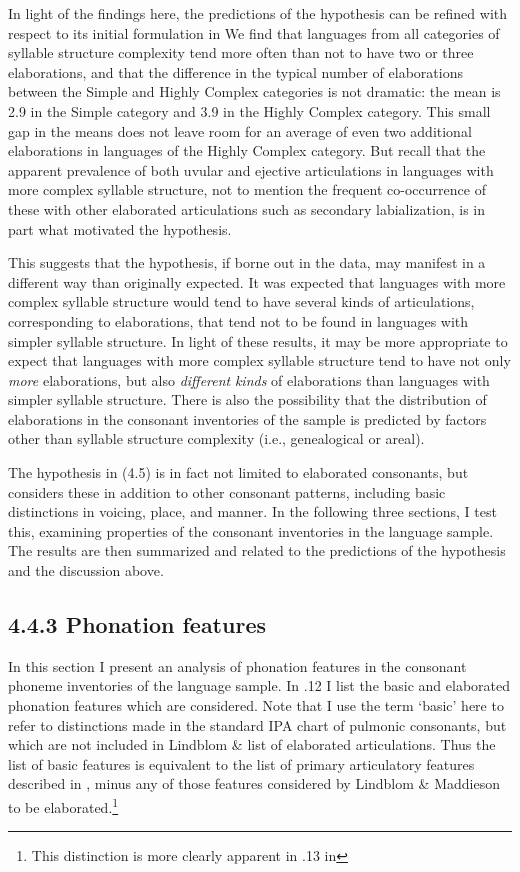   In light of the findings here, the predictions of the hypothesis can be refined with respect to its initial formulation in  We find that languages from all categories of syllable structure complexity tend more often than not to have two or three elaborations, and that the difference in the typical number of elaborations between the Simple and Highly Complex categories is not dramatic: the mean is 2.9 in the Simple category and 3.9 in the Highly Complex category. This small gap in the means does not leave room for an average of even two additional elaborations in languages of the Highly Complex category. But recall that the apparent prevalence of both uvular and ejective articulations in languages with more complex syllable structure, not to mention the frequent co-occurrence of these with other elaborated articulations such as secondary labialization, is in part what motivated the hypothesis.

  This suggests that the hypothesis, if borne out in the data, may manifest in a different way than originally expected. It was expected that languages with more complex syllable structure would tend to have several kinds of articulations, corresponding to elaborations, that tend not to be found in languages with simpler syllable structure. In light of these results, it may be more appropriate to expect that languages with more complex syllable structure tend to have not only \textit{more} elaborations, but also \textit{different} \textit{kinds} of elaborations than languages with simpler syllable structure. There is also the possibility that the distribution of elaborations in the consonant inventories of the sample is predicted by factors other than syllable structure complexity (i.e., genealogical or areal).

  The hypothesis in (4.5) is in fact not limited to elaborated consonants, but considers these in addition to other consonant patterns, including basic distinctions in voicing, place, and manner. In the following three sections, I test this, examining properties of the consonant inventories in the language sample. The results are then summarized and related to the predictions of the hypothesis and the discussion above.

\subsection{4.4.3 Phonation features}

  In this section I present an analysis of phonation features in the consonant phoneme inventories of the language sample. In .12 I list the basic and elaborated phonation features which are considered. Note that I use the term ‘basic’ here to refer to distinctions made in the standard IPA chart of pulmonic consonants, but which are not included in Lindblom \&  list of elaborated articulations. Thus the list of basic features is equivalent to the list of primary articulatory features described in , minus any of those features considered by Lindblom \& Maddieson to be elaborated.\footnote{ \textrm{This distinction is more clearly apparent in .13 in }}

